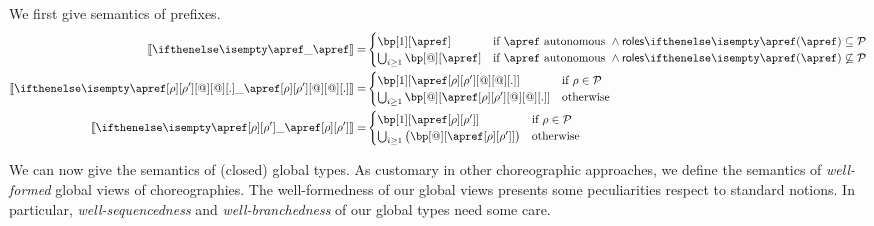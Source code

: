 We first give semantics of prefixes.
\begin{align*}
  \ksem{\apref} =
  &
    \begin{cases}
      \bp[1][\apref]
      & \text{if $\apref$ autonomous } \land \roles{\apref} \subseteq \participants
      \\
      \bigcup_{i \geq 1}\bp[@][\apref]
      & \text{if $\apref$ autonomous } \land \roles{\apref} \not\subseteq \participants
    \end{cases}
  \\
  \ksem{\apref[\arole][\arole'][@][@][.]} =
  &
    \begin{cases}
      \bp[1][{\apref[\arole][\arole'][@][@][.]}]
      & \text{if } \arole \in \participants
      \\
      \bigcup_{i \geq 1}\bp[@][{\apref[\arole][\arole'][@][@][.]}]
      & \text{otherwise}
    \end{cases}
  \\
  \ksem{\apref[\arole][\arole']} =
  &
    \begin{cases}
      \bp[1][{\apref[\arole][\arole']}]
      & \text{if } \arole \in \participants
      \\
      \bigcup_{i \geq 1}\big(\bp[@][{\apref[\arole][\arole']}]\big)
      & \text{otherwise}
    \end{cases}
\end{align*}

We can now give the semantics of (closed) global types.
%
As customary in other choreographic approaches, we define the
semantics of \emph{well-formed} global views of choreographies.
%
The well-formedness of our global views presents some peculiarities
respect to standard notions.
%
In particular, \emph{well-sequencedness} and \emph{well-branchedness}
of our global types need some care.

